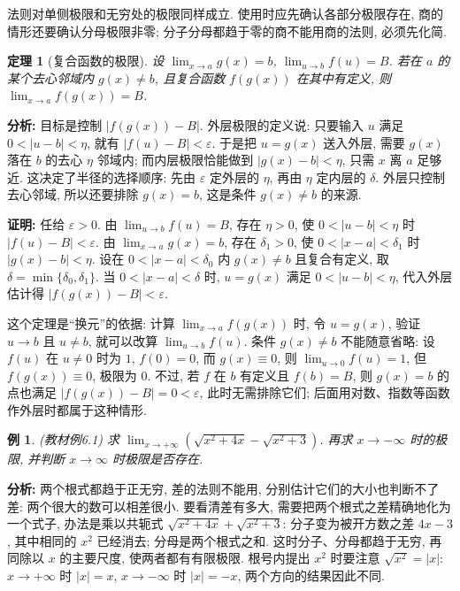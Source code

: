 \documentclass[UTF8,openany]{ctexbook}
\theoremstyle{chinesetextbook}
\newtheorem{example}{例}[section]
\newtheorem{theorem}{定理}[section]
\newenvironment{cnproof}{\par\indent\textbf{证明:} \ignorespaces}{\par}
\begin{document}
法则对单侧极限和无穷处的极限同样成立. 使用时应先确认各部分极限存在, 商的情形还要确认分母极限非零; 分子分母都趋于零的商不能用商的法则, 必须先化简.
\begin{theorem}[复合函数的极限]
设 $\displaystyle\lim_{x\to a}g(x)=b$, $\displaystyle\lim_{u\to b}f(u)=B$. 若在 $a$ 的某个去心邻域内 $g(x)\ne b$, 且复合函数 $f(g(x))$ 在其中有定义, 则 $\displaystyle\lim_{x\to a}f(g(x))=B$.
\end{theorem}
\par\indent\textbf{分析:} 目标是控制 $|f(g(x))-B|$. 外层极限的定义说: 只要输入 $u$ 满足 $0<|u-b|<\eta$, 就有 $|f(u)-B|<\varepsilon$. 于是把 $u=g(x)$ 送入外层, 需要 $g(x)$ 落在 $b$ 的去心 $\eta$ 邻域内; 而内层极限恰能做到 $|g(x)-b|<\eta$, 只需 $x$ 离 $a$ 足够近. 这决定了半径的选择顺序: 先由 $\varepsilon$ 定外层的 $\eta$, 再由 $\eta$ 定内层的 $\delta$. 外层只控制去心邻域, 所以还要排除 $g(x)=b$, 这是条件 $g(x)\ne b$ 的来源.
\begin{cnproof}
任给 $\varepsilon>0$. 由 $\displaystyle\lim_{u\to b}f(u)=B$, 存在 $\eta>0$, 使 $0<|u-b|<\eta$ 时 $|f(u)-B|<\varepsilon$. 由 $\displaystyle\lim_{x\to a}g(x)=b$, 存在 $\delta_1>0$, 使 $0<|x-a|<\delta_1$ 时 $|g(x)-b|<\eta$. 设在 $0<|x-a|<\delta_0$ 内 $g(x)\ne b$ 且复合有定义, 取 $\delta=\min\{\delta_0,\delta_1\}$. 当 $0<|x-a|<\delta$ 时, $u=g(x)$ 满足 $0<|u-b|<\eta$, 代入外层估计得 $|f(g(x))-B|<\varepsilon$.
\end{cnproof}
这个定理是“换元”的依据: 计算 $\displaystyle\lim_{x\to a}f(g(x))$ 时, 令 $u=g(x)$, 验证 $u\to b$ 且 $u\ne b$, 就可以改算 $\displaystyle\lim_{u\to b}f(u)$. 条件 $g(x)\ne b$ 不能随意省略: 设 $f(u)$ 在 $u\ne0$ 时为 $1$, $f(0)=0$, 而 $g(x)\equiv0$, 则 $\displaystyle\lim_{u\to0}f(u)=1$, 但 $f(g(x))\equiv0$, 极限为 $0$. 不过, 若 $f$ 在 $b$ 有定义且 $f(b)=B$, 则 $g(x)=b$ 的点也满足 $|f(g(x))-B|=0<\varepsilon$, 此时无需排除它们; 后面用对数、指数等函数作外层时都属于这种情形.
\begin{example}
\textnormal{(教材例6.1)} 求 $\displaystyle \lim_{x\to+\infty}\left(\sqrt{x^2+4x}-\sqrt{x^2+3}\right)$. 再求 $x\to-\infty$ 时的极限, 并判断 $x\to\infty$ 时极限是否存在.
\end{example}
\par\indent\textbf{分析:} 两个根式都趋于正无穷, 差的法则不能用, 分别估计它们的大小也判断不了差: 两个很大的数可以相差很小. 要看清差有多大, 需要把两个根式之差精确地化为一个式子, 办法是乘以共轭式 $\sqrt{x^2+4x}+\sqrt{x^2+3}$: 分子变为被开方数之差 $4x-3$, 其中相同的 $x^2$ 已经消去; 分母是两个根式之和. 这时分子、分母都趋于无穷, 再同除以 $x$ 的主要尺度, 使两者都有有限极限. 根号内提出 $x^2$ 时要注意 $\sqrt{x^2}=|x|$: $x\to+\infty$ 时 $|x|=x$, $x\to-\infty$ 时 $|x|=-x$, 两个方向的结果因此不同.
\end{document}
